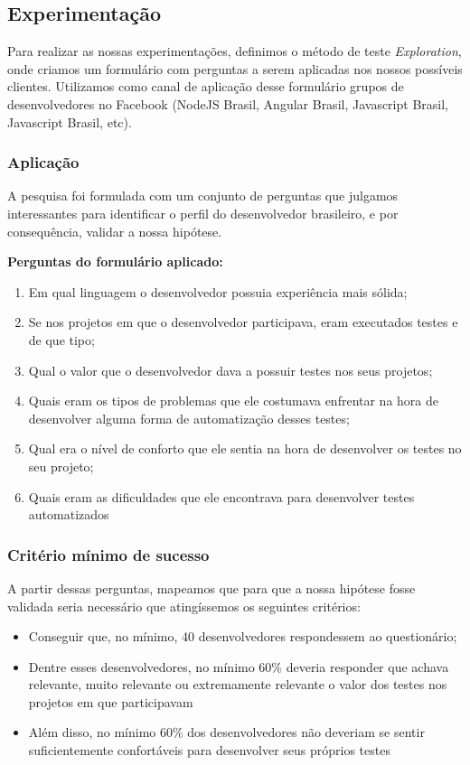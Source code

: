 \subsection{Experimentação}

Para realizar as nossas experimentações, definimos o método de teste \emph{Exploration}, onde criamos um formulário com perguntas a serem aplicadas nos nossos possíveis clientes. Utilizamos como canal de aplicação desse formulário grupos de desenvolvedores no Facebook (NodeJS Brasil, Angular Brasil, Javascript Brasil, Javascript Brasil, etc).

\subsubsection{Aplicação}
A pesquisa foi formulada com um conjunto de perguntas que julgamos interessantes para identificar o perfil do desenvolvedor brasileiro, e por consequência, validar a nossa hipótese.

\textbf{Perguntas do formulário aplicado:}
\begin{enumerate}
\item Em qual linguagem o desenvolvedor possuia experiência mais sólida;
\item Se nos projetos em que o desenvolvedor participava, eram executados testes e de que tipo;
\item Qual o valor que o desenvolvedor dava a possuir testes nos seus projetos;
\item Quais eram os tipos de problemas que ele costumava enfrentar na hora de desenvolver alguma forma de automatização desses testes;
\item Qual era o nível de conforto que ele sentia na hora de desenvolver os testes no seu projeto;
\item Quais eram as dificuldades que ele encontrava para desenvolver testes automatizados
\end{enumerate}

\subsubsection{Critério mínimo de sucesso}
A partir dessas perguntas, mapeamos que para que a nossa hipótese fosse validada seria necessário que atingíssemos os seguintes critérios:

\begin{itemize}
\item Conseguir que, no mínimo, 40 desenvolvedores respondessem ao questionário;
\item Dentre esses desenvolvedores, no mínimo 60\% deveria responder que achava relevante, muito relevante ou extremamente relevante o valor dos testes nos projetos em que participavam
\item Além disso, no mínimo 60\% dos desenvolvedores não deveriam se sentir suficientemente confortáveis para desenvolver seus próprios testes
\end{itemize}

